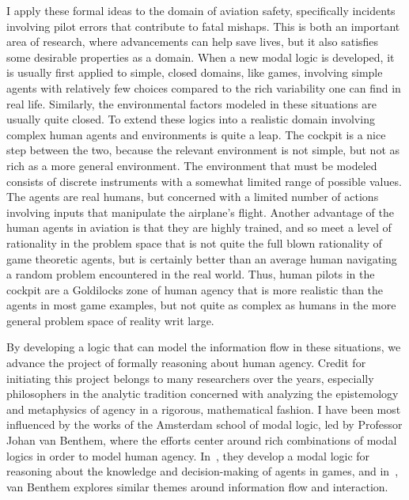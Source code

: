 I apply these formal ideas to the domain of aviation safety, specifically incidents involving pilot errors that contribute to fatal mishaps. This is both an important area of research, where advancements can help save lives, but it also satisfies some desirable properties as a domain. When a new modal logic is developed, it is usually first applied to simple, closed domains, like games, involving simple agents with relatively few choices compared to the rich variability one can find in real life. Similarly, the environmental factors modeled in these situations are usually quite closed. To extend these logics into a realistic domain involving complex human agents and environments is quite a leap. The cockpit is a nice step between the two, because the relevant environment is not simple, but not as rich as a more general environment. The environment that must be modeled consists of discrete instruments with a somewhat limited range of possible values. The agents are real humans, but concerned with a limited number of actions involving inputs that manipulate the airplane's flight. Another advantage of the human agents in aviation is that they are highly trained, and so meet a level of rationality in the problem space that is not quite the full blown rationality of game theoretic agents, but is certainly better than an average human navigating a random problem encountered in the real world. Thus, human pilots in the cockpit are a Goldilocks zone of human agency that is more realistic than the agents in most game examples, but not quite as complex as humans in the more general problem space of reality writ large.

By developing a logic that can model the information flow in these situations, we advance the project of formally reasoning about human agency. Credit for initiating this project belongs to many researchers over the years, especially philosophers in the analytic tradition concerned with analyzing the epistemology and metaphysics of agency in a rigorous, mathematical fashion. I have been most influenced by the works of the Amsterdam school of modal logic, led by Professor Johan van Benthem, where the efforts center around rich combinations of modal logics in order to model human agency. In~\cite{VB_TowardPlay}, they develop a modal logic for reasoning about the knowledge and decision-making of agents in games, and in~\cite{VB_LDII}, van Benthem explores similar themes around information flow and interaction. 

